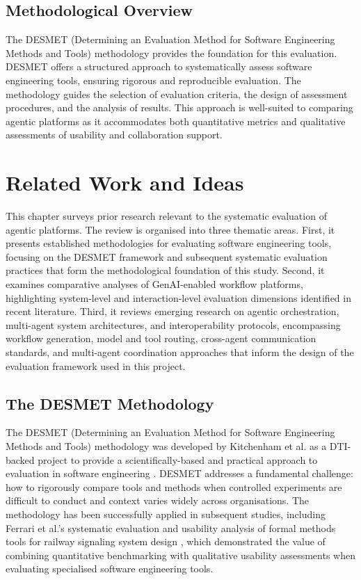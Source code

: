 \documentclass[]
{UCD_CS_FYP_Report}
\begin{document}
\section{Methodological Overview}

The DESMET (Determining an Evaluation Method for Software Engineering Methods and Tools) methodology provides the foundation for this evaluation. DESMET offers a structured approach to systematically assess software engineering tools, ensuring rigorous and reproducible evaluation. The methodology guides the selection of evaluation criteria, the design of assessment procedures, and the analysis of results. This approach is well-suited to comparing agentic platforms as it accommodates both quantitative metrics and qualitative assessments of usability and collaboration support.

\chapter{Related Work and Ideas}

This chapter surveys prior research relevant to the systematic evaluation of agentic platforms. The review is organised into three thematic areas. First, it presents established methodologies for evaluating software engineering tools, focusing on the DESMET framework and subsequent systematic evaluation practices that form the methodological foundation of this study. Second, it examines comparative analyses of GenAI-enabled workflow platforms, highlighting system-level and interaction-level evaluation dimensions identified in recent literature. Third, it reviews emerging research on agentic orchestration, multi-agent system architectures, and interoperability protocols, encompassing workflow generation, model and tool routing, cross-agent communication standards, and multi-agent coordination approaches that inform the design of the evaluation framework used in this project.

\section{The DESMET Methodology}

The DESMET (Determining an Evaluation Method for Software Engineering Methods and Tools) methodology was developed by Kitchenham et al. as a DTI-backed project to provide a scientifically-based and practical approach to evaluation in software engineering \cite{kitchenham1997desmet}. DESMET addresses a fundamental challenge: how to rigorously compare tools and methods when controlled experiments are difficult to conduct and context varies widely across organisations. The methodology has been successfully applied in subsequent studies, including Ferrari et al.'s systematic evaluation and usability analysis of formal methods tools for railway signaling system design \cite{ferrari2021systematic}, which demonstrated the value of combining quantitative benchmarking with qualitative usability assessments when evaluating specialised software engineering tools.
\end{document}
